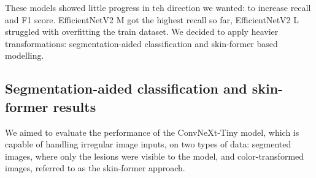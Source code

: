 \begin{table}[h!]
\centering
\caption{Performance comparison between EfficientNet-M and Efficient-L models.}
\label{tab:efficient-models}
\end{table}

These models showed little progress in teh direction we wanted: to increase recall and F1 score. EfficientNetV2 M  got the highest recall so far, EfficientNetV2 L struggled with overfitting the train dataset.
We decided to apply heavier transformations: segmentation-aided classification and skin-former based modelling.

\subsection{Segmentation-aided classification and skin-former results}

We aimed to evaluate the performance of the ConvNeXt-Tiny model, which is capable of handling irregular image inputs, on two types of data: segmented images, where only the lesions were visible to the model, and color-transformed images, referred to as the skin-former approach.

\begin{table}[H]
\centering
\caption{Performance of ConvNeXt-Tiny on 224x224 CIELAB images with skin color transformer augmentation and masked skin augmentation.}
\label{tab:transformer-results}
\end{table}

